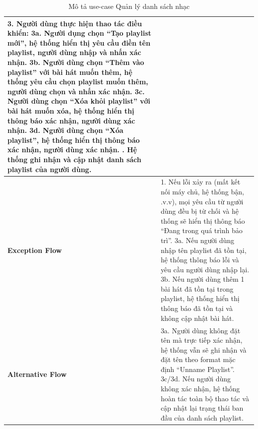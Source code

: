 \documentclass[a4paper]{article}
\newcommand{\cach}{\hspace*{1.5em}\ignorespaces}
\begin{document}
\begin{table}[H]
\begin{tabularx}{\textwidth}{|l|X|}
		3. Người dùng thực hiện thao tác điều khiển: \newline
		\cach 3a. Người dụng chọn ``Tạo playlist mới'', hệ thống hiển thị yêu cầu điền tên playlist, người dùng nhập và nhấn xác nhận. \newline
		\cach 3b. Người dùng chọn ``Thêm vào playlist'' với bài hát muốn thêm, hệ thống yêu cầu chọn playlist muốn thêm, người dùng chọn và nhấn xác nhận. \newline
		\cach 3c. Người dùng chọn ``Xóa khỏi playlist'' với bài hát muốn xóa, hệ thống hiển thị thông báo xác nhận, người dùng xác nhận. \newline
		\cach 3d. Người dùng chọn ``Xóa playlist'', hệ thống hiển thị thông báo xác nhận, người dùng xác nhận. \newline
		4. Hệ thống ghi nhận và cập nhật danh sách playlist của người dùng.                                                                                                                                         \\ \hline
		\textbf{Exception Flow}
		                       & 1. Nếu lỗi xảy ra (mất kết nối máy chủ, hệ thống bận, .v.v), mọi yêu cầu từ người dùng đều bị từ chối và hệ thống sẽ hiển thị thông báo ``Đang trong quá trình bảo trì''. \newline
		3a. Nếu người dùng nhập tên playlist đã tồn tại, hệ thống thông báo lỗi và yêu cầu người dùng nhập lại. \newline
		3b. Nếu người dùng thêm 1 bài hát đã tồn tại trong playlist, hệ thống hiển thị thông báo đã tồn tại và không cập nhật bài hát.                                                                              \\ \hline
		\textbf{Alternative Flow}
		                       & 3a. Người dùng không đặt tên mà trực tiếp xác nhận, hệ thống vẫn sẽ ghi nhận và đặt tên theo format mặc định ``Unname Playlist''.\newline
		3c/3d. Nếu người dùng không xác nhận, hệ thống hoàn tác toàn bộ thao tác và cập nhật lại trạng thái ban đầu của danh sách playlist.                                                                         \\ \hline
	\end{tabularx}
	\caption{Mô tả use-case Quản lý danh sách nhạc}
\end{table}

\end{document}

